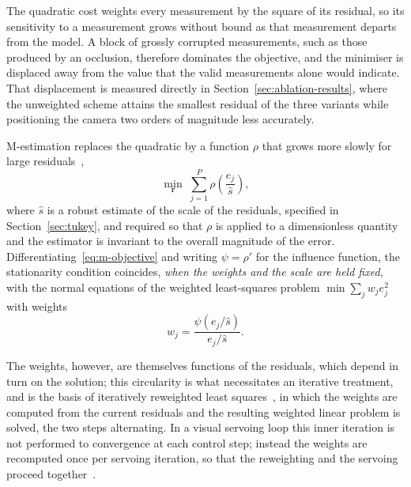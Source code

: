 The quadratic cost weights every measurement by the square of its residual, so
its sensitivity to a measurement grows without bound as that measurement
departs from the model. A block of grossly corrupted measurements, such as
those produced by an occlusion, therefore dominates the objective, and the
minimiser is displaced away from the value that the valid measurements alone
would indicate. That displacement is measured directly in
Section~\ref{sec:ablation-results}, where the unweighted scheme attains the
smallest residual of the three variants while positioning the camera two
orders of magnitude less accurately.

M-estimation replaces the quadratic by a function $\rho$ that grows more
slowly for large residuals~\cite{key49},
\begin{equation}
    \min_{\mathbf{r}}\;\sum_{j=1}^{P}\rho\!\left(\frac{e_{j}}{\hat{s}}\right),
    \label{eq:m-objective}
\end{equation}
where $\hat{s}$ is a robust estimate of the scale of the residuals, specified
in Section~\ref{sec:tukey}, and required so that $\rho$ is applied to a
dimensionless quantity and the estimator is invariant to the overall magnitude
of the error. Differentiating~\eqref{eq:m-objective} and writing $\psi=\rho'$
for the influence function, the stationarity condition coincides, \emph{when
the weights and the scale are held fixed}, with the normal equations of the
weighted least-squares problem $\min\sum_{j}w_{j}e_{j}^{2}$ with weights
\begin{equation}
    w_{j}=\frac{\psi(e_{j}/\hat{s})}{e_{j}/\hat{s}}.
    \label{eq:irls-weight}
\end{equation}

The weights, however, are themselves functions of the residuals, which depend
in turn on the solution; this circularity is what necessitates an iterative
treatment, and is the basis of iteratively reweighted least
squares~\cite{key50}, in which the weights are computed from the current
residuals and the resulting weighted linear problem is solved, the two steps
alternating. In a visual servoing loop this inner iteration is not performed
to convergence at each control step; instead the weights are recomputed once
per servoing iteration, so that the reweighting and the servoing proceed
together~\cite{key26}.

